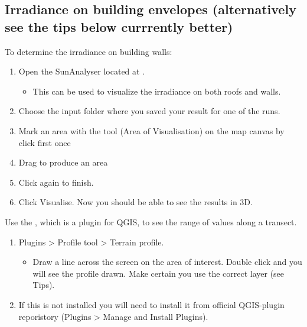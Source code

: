 \documentclass[letterpaper,10pt,english]{sphinxmanual}
\begin{document}
\subsection{Irradiance on building envelopes (alternatively see the tips below \textendash{} currrently better)}
\label{\detokenize{Tutorials/SEBE:irradiance-on-building-envelopes-alternatively-see-the-tips-below-currrently-better}}
To determine the irradiance on building walls:
\begin{enumerate}
\item {} 
Open the SunAnalyser located at .
\begin{itemize}
\item {} 
This can be used to visualize the irradiance on both roofs and
walls.

\end{itemize}

\item {} 
Choose the input folder where you saved your result for one of the
runs.

\item {} 
Mark an area with the tool (Area of Visualisation) on the map canvas
by click first once

\item {} 
Drag to produce an area

\item {} 
Click again to finish.

\item {} 
Click Visualise. Now you should be able to see the results in 3D.

\end{enumerate}


Use the , which is a plugin for QGIS, to see the range of values along a transect.
\begin{enumerate}
\item {} 
Plugins \textgreater{} Profile tool \textgreater{} Terrain profile.
\begin{itemize}
\item {} 
Draw a line across the screen on the area of interest. Double
click and you will see the profile drawn. Make certain you use the
correct layer (see Tips).

\end{itemize}

\item {} 
If this is not installed you will need to install it from official
QGIS-plugin reporistory (Plugins \textgreater{} Manage and Install Plugins).

\end{enumerate}
\end{document}
